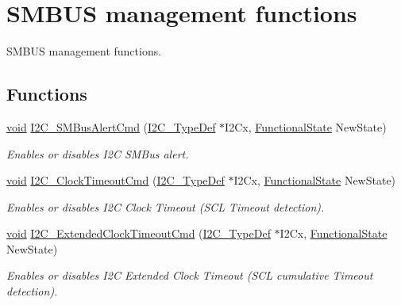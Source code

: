 \hypertarget{group___i2_c___group3}{\section{S\-M\-B\-U\-S management functions}
\label{group___i2_c___group3}
}


S\-M\-B\-U\-S management functions.  


\subsection*{Functions}
\begin{DoxyCompactItemize}
\item 
\hyperlink{group___n_a_m_e_ga18028b8badbf1ea7e704ccac3c488e82}{void} \hyperlink{group___i2_c___group3_ga816be264da9e06a5eb6518956a119073}{I2\-C\-\_\-\-S\-M\-Bus\-Alert\-Cmd} (\hyperlink{struct_i2_c___type_def}{I2\-C\-\_\-\-Type\-Def} $\ast$I2\-Cx, \hyperlink{group___exported__types_gac9a7e9a35d2513ec15c3b537aaa4fba1}{Functional\-State} New\-State)
\begin{DoxyCompactList}\small\item\em Enables or disables I2\-C S\-M\-Bus alert. \end{DoxyCompactList}\item 
\hyperlink{group___n_a_m_e_ga18028b8badbf1ea7e704ccac3c488e82}{void} \hyperlink{group___i2_c___group3_ga08dc51fa5077a1d50920811af38593c2}{I2\-C\-\_\-\-Clock\-Timeout\-Cmd} (\hyperlink{struct_i2_c___type_def}{I2\-C\-\_\-\-Type\-Def} $\ast$I2\-Cx, \hyperlink{group___exported__types_gac9a7e9a35d2513ec15c3b537aaa4fba1}{Functional\-State} New\-State)
\begin{DoxyCompactList}\small\item\em Enables or disables I2\-C Clock Timeout (S\-C\-L Timeout detection). \end{DoxyCompactList}\item 
\hyperlink{group___n_a_m_e_ga18028b8badbf1ea7e704ccac3c488e82}{void} \hyperlink{group___i2_c___group3_gac01ac1f4eb453b830a8efb3f83649a0d}{I2\-C\-\_\-\-Extended\-Clock\-Timeout\-Cmd} (\hyperlink{struct_i2_c___type_def}{I2\-C\-\_\-\-Type\-Def} $\ast$I2\-Cx, \hyperlink{group___exported__types_gac9a7e9a35d2513ec15c3b537aaa4fba1}{Functional\-State} New\-State)
\begin{DoxyCompactList}\small\item\em Enables or disables I2\-C Extended Clock Timeout (S\-C\-L cumulative Timeout detection). \end{DoxyCompactList}\item 

\end{DoxyCompactItemize}

